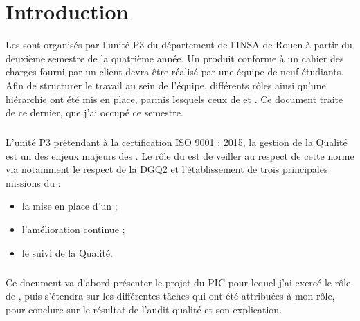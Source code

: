 \documentclass[asi]{picInsa}
\begin{document}
\couverture{}

\informationsGenerales{}
%





\tableofcontents

\setcounter{chapter}{0}

\chapter{Introduction}
\label{Introduction}

Les \PIC{} sont organisés par l'unité P3 du département \ASI{} de l'INSA de Rouen à partir du deuxième semestre de la quatrième année. Un produit conforme à un cahier des charges fourni par un client devra être réalisé par une équipe de neuf étudiants. Afin de structurer le travail au sein de l'équipe, différents rôles ainsi qu'une hiérarchie ont été mis en place, parmis lesquels ceux de \CP{} et \RQ{}. Ce document traite de ce dernier, que j'ai occupé ce semestre.
\paragraph*{}
L'unité P3 prétendant à la certification ISO 9001 : 2015, la gestion de la Qualité est un des enjeux majeurs des \PICCourt{}. Le rôle du \RQ{} est de veiller au respect de cette norme via notamment le respect de la DGQ2 et l'établissement de trois principales missions du \RQCourt{} :
\begin{itemize}
\item la mise en place d'un \SMQ{} ; 
\item l'amélioration continue ;
\item le suivi de la Qualité.
\end{itemize}
\paragraph*{}
Ce document va d’abord présenter le projet du PIC \nomEquipe{} pour lequel j’ai exercé le rôle de \RQ{}, puis s’étendra sur les différentes tâches qui ont été attribuées à mon rôle, pour conclure sur le résultat de l’audit qualité et son explication.
\end{document}
